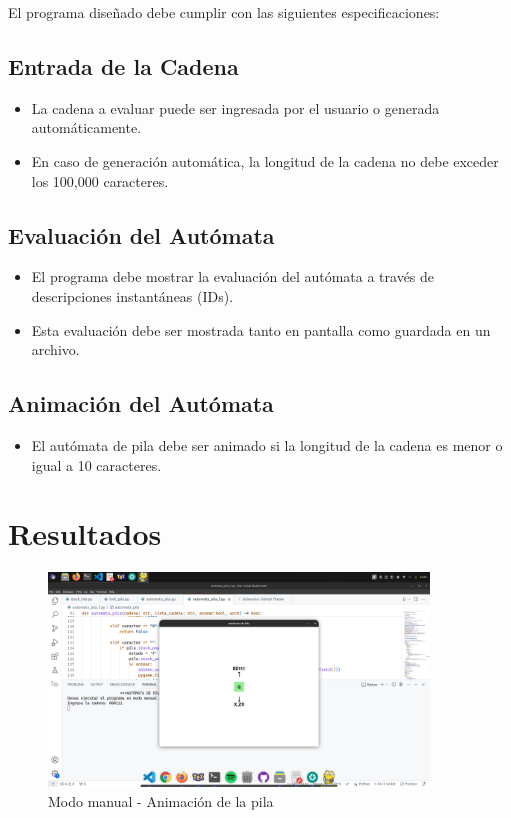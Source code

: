 \documentclass[11pt]{article} %
\begin{document}
	El programa diseñado debe cumplir con las siguientes especificaciones:
	
	\subsection{Entrada de la Cadena}
	\begin{itemize}
		\item La cadena a evaluar puede ser ingresada por el usuario o generada automáticamente.
		\item En caso de generación automática, la longitud de la cadena no debe exceder los 100,000 caracteres.
	\end{itemize}
	
	\subsection{Evaluación del Autómata}
	\begin{itemize}
		\item El programa debe mostrar la evaluación del autómata a través de descripciones instantáneas (IDs).
		\item Esta evaluación debe ser mostrada tanto en pantalla como guardada en un archivo.
	\end{itemize}
	
	\subsection{Animación del Autómata}
	\begin{itemize}
		\item El autómata de pila debe ser animado si la longitud de la cadena es menor o igual a 10 caracteres.
	\end{itemize}
	
	
	
	\section{Resultados}
	
	
	\begin{figure}[h]
		\centering
		\includegraphics[width=0.9\textwidth]{manual}
		\caption{Modo manual - Animación de la pila}
	\end{figure}
	
\end{document}
